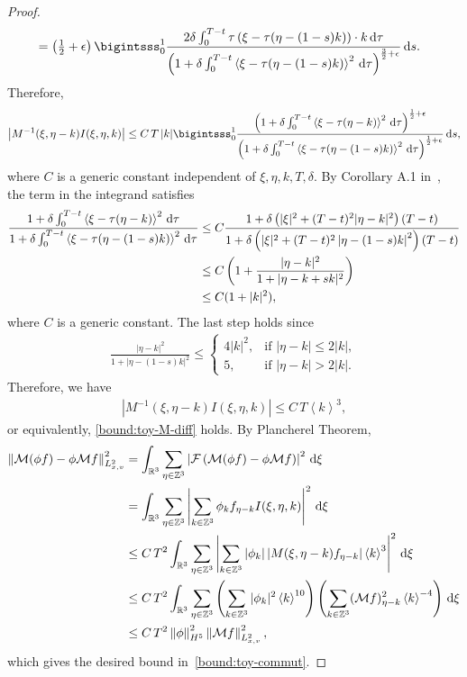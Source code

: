 \documentclass[11pt,american, reqno]{amsart}
\numberwithin{equation}{section}
\newcommand{\R}{\mathbb R}
\newcommand{\1}{\mathds{1}}
\newcommand{\ZZ}{{\mathbb{Z}}}
\newcommand{\ds}{\, {\rm d} s}
\newcommand{\CalM}{\mathcal{M}}
\newcommand{\CalF}{\mathcal{F}}
\newcommand{\dxi}{\, {\rm d} \xi}
\newcommand{\dtau}{\, {\rm d} \tau}
\newcommand{\vpran}[1]{\left(#1\right)}
\newcommand{\Eps}{\epsilon}
\newcommand{\norm}[1]{\left\lVert#1\right\rVert}
\newcommand{\abs}[1]{\left\vert#1\right\vert}
\newcommand{\vint}[1]{\left\langle#1\right\rangle}
\numberwithin{equation}{section}
\begin{document}
\begin{proof}
\begin{align*}
&= \vpran{\tfrac{1}{2} + \Eps}
   \bigintsss_0^1
   \frac{2\delta \int_0^{T-t} 
     \tau \vpran{\xi - \tau (\eta - (1-s) k)} \cdot k \dtau}{\vpran{1 + \delta \int_0^{T-t} \vint{\xi - \tau (\eta - (1-s) k)}^2 \dtau}^{\frac{3}{2}+\Eps}} \ds.
\end{align*}
Therefore,
\begin{align*}
 \abs{M^{-1} (\xi, \eta - k) I (\xi, \eta, k)}
\leq
  C \, T \, |k| 
  \bigintsss_0^1
  \frac{\vpran{1 + \delta \int_0^{T-t} \vint{\xi - \tau (\eta - k)}^2 \dtau}^{\frac{1}{2}+\Eps}}{\vpran{1 + \delta \int_0^{T-t} \vint{\xi - \tau (\eta - (1-s) k)}^2 \dtau}^{\frac{1}{2}+\Eps}} \ds ,
\end{align*}
where $C$ is a generic constant independent of $\xi, \eta, k, T, \delta$. By Corollary A.1 in~\cite{AMSY2020}, the term in the integrand satisfies
\begin{align*}
 \frac{1 + \delta \int_0^{T-t} \vint{\xi - \tau (\eta - k)}^2 \dtau}{1 + \delta \int_0^{T-t} \vint{\xi - \tau (\eta - (1-s) k)}^2 \dtau}
& \leq  
 C\frac{1 + \delta \vpran{|\xi|^2 + (T-t)^2 |\eta - k|^2} (T-t)}{1+ \delta \vpran{|\xi|^2 + (T-t)^2 \abs{\eta - (1-s) k}^2} (T-t)}
\\
& \leq
  C \vpran{1 + \frac{|\eta - k|^2}{1 + |\eta - k + s k|^2}} 
\\
& \leq C (1 + |k|^2) ,
\end{align*}
where $C$ is a generic constant. The last step holds since 
\begin{align*}
 \frac{|\eta - k|^2}{1 + |\eta - (1-s) k|^2}
\leq
\begin{cases}
  4 |k|^2,  & \text{if } |\eta - k| \leq 2 |k|, 
\\[3pt]
  5, & \text{if } |\eta - k| > 2 |k|. 
\end{cases} 
\end{align*}
Therefore, we have
\begin{align*}
  \abs{M^{-1} (\xi, \eta - k) I (\xi, \eta, k)}
\leq
  C \, T  \vint{k}^3,
\end{align*}
or equivalently, \eqref{bound:toy-M-diff} holds. By Plancherel Theorem, 
\begin{align*}
  \norm{\CalM (\phi f) - \phi \CalM f}_{L^2_{x,v}}^2
&= \int_{\R^3} \sum_{\eta \in \ZZ^3}
  \abs{\CalF \vpran{\CalM (\phi f) - \phi \CalM f}}^2 \dxi 
\\
& = \int_{\R^3} \sum_{\eta \in \ZZ^3}
  \abs{\sum_{k \in \ZZ^3} \phi_k f_{\eta - k} I(\xi, \eta, k)}^2 \dxi
\\
& \leq
 C \, T^2 \int_{\R^3} \sum_{\eta \in \ZZ^3}
  \abs{\sum_{k \in \ZZ^3} \abs{\phi_k} \abs{M(\xi, \eta - k) f_{\eta - k}} \vint{k}^3}^2 \dxi
\\
& \leq
  C \, T^2 \int_{\R^3} \sum_{\eta \in \ZZ^3}
  \vpran{\sum_{k \in \ZZ^3} |\phi_k|^2\vint{k}^{10}}
  \vpran{\sum_{k \in \ZZ^3} (\CalM f)_{\eta - k}^2 \vint{k}^{-4}} \dxi
\\
& \leq  
 C \, T^2 \norm{\phi}_{H^5}^2 \norm{\CalM f}_{L^2_{x,v}}^2,
\end{align*}
which gives the desired bound in~\eqref{bound:toy-commut}.
\end{proof}
\end{document}
